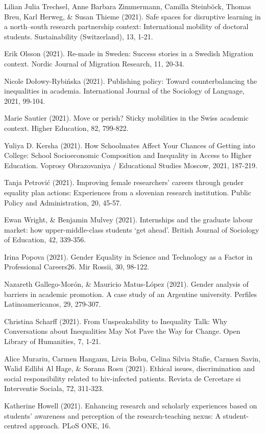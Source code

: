 \documentclass[runningheads]{llncs}
\begin{document}
\begin{multicols}{2}
Lilian Julia Trechsel, Anne Barbara Zimmermann, Camilla Steinböck, Thomas Breu, Karl Herweg, \& Susan Thieme (2021). Safe spaces for disruptive learning in a north–south research partnership context: International mobility of doctoral students. Sustainability (Switzerland), 13, 1-21.

Erik Olsson (2021). Re-made in Sweden: Success stories in a Swedish Migration context. Nordic Journal of Migration Research, 11, 20-34.

Nicole Dołowy-Rybińska (2021). Publishing policy: Toward counterbalancing the inequalities in academia. International Journal of the Sociology of Language, 2021, 99-104.

Marie Sautier (2021). Move or perish? Sticky mobilities in the Swiss academic context. Higher Education, 82, 799-822.

Yuliya D. Kersha (2021). How Schoolmates Affect Your Chances of Getting into College: School Socioeconomic Composition and Inequality in Access to Higher Education. Voprosy Obrazovaniya / Educational Studies Moscow, 2021, 187-219.

Tanja Petrović (2021). Improving female researchers' careers through gender equality plan actions: Experiences from a slovenian research institution. Public Policy and Administration, 20, 45-57.

Ewan Wright, \& Benjamin Mulvey (2021). Internships and the graduate labour market: how upper-middle-class students ‘get ahead’. British Journal of Sociology of Education, 42, 339-356.

Irina Popova (2021). Gender Equality in Science and Technology as a Factor in Professional Careers26. Mir Rossii, 30, 98-122.

Nazareth Gallego-Morón, \& Mauricio Matus-López (2021). Gender analysis of barriers in academic promotion. A case study of an Argentine university. Perfiles Latinoamericanos, 29, 279-307.

Christina Scharff (2021). From Unspeakability to Inequality Talk: Why Conversations about Inequalities May Not Pave the Way for Change. Open Library of Humanities, 7, 1-21.

Alice Murariu, Carmen Hanganu, Livia Bobu, Celina Silvia Stafie, Carmen Savin, Walid Edlibi Al Hage, \& Sorana Rosu (2021). Ethical issues, discrimination and social responsibility related to hiv-infected patients. Revista de Cercetare si Interventie Sociala, 72, 311-323.

Katherine Howell (2021). Enhancing research and scholarly experiences based on students’ awareness and perception of the research-teaching nexus: A student-centred approach. PLoS ONE, 16.


\end{multicols}
\end{document}

